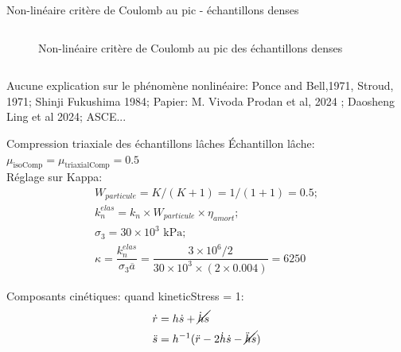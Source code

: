 \documentclass[10pt]{beamer}
\begin{document}
\begin{frame}{Non-linéaire critère de Coulomb au pic - échantillons denses}
\begin{columns}
\begin{column}{0.5\textwidth}
\begin{figure}[h]
                \caption{Non-linéaire critère de Coulomb au pic des échantillons denses}
            \end{figure}
        \end{column}
    \end{columns}
                Aucune explication sur le phénomène nonlinéaire: Ponce and Bell,1971, Stroud, 1971; Shinji Fukushima 1984;
Papier: M. Vivoda Prodan et al, 2024 ;
Daosheng Ling et al 2024;
ASCE...
\end{frame}


\begin{frame}{Compression triaxiale des échantillons lâches}
    Échantillon lâche: $ \mu_{\text{isoComp}} = \mu_{\text{triaxialComp}} = 0.5$ \\

        Réglage sur Kappa:
    \begin{align*}
            W_{particule} = K / (K + 1) = 1 / (1 + 1) = 0.5; \\
            k_n^{elas} = k_n \times W_{particule} \times \eta_{amort}; \\
            \sigma_3 = 30 \times 10^3 \text{ kPa}; \\
    \kappa = \dfrac{k_n^{elas}}{\sigma_3 \overline{a}} = \dfrac{3\times10^{6}/2}{30\times10^{3} \times (2 \times 0.004)} = 6250
\end{align*}

    Composants cinétiques: quand kineticStress = 1:
        \begin{align*}
    \dot{r} &= h\dot{s} + \cancel{\dot{h}s} \\
    \ddot{s} &= h^{-1}(\ddot{r} - 2\dot{h}\dot{s} - \cancel{\ddot{h}s})
    \end{align*}


\end{frame}
\end{document}
